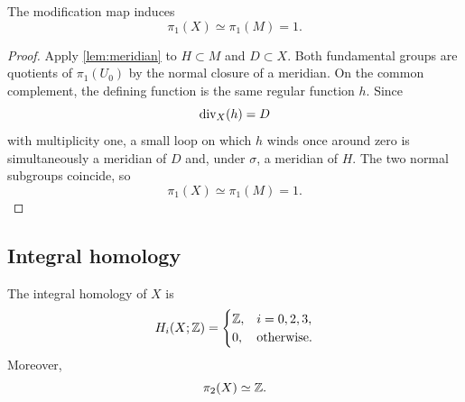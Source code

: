 \begin{theorem}\label{thm:pi1}
The modification map induces
\[
  \pi_1(X)\simeq\pi_1(M)=1.
\]
\end{theorem}

\begin{proof}
Apply \cref{lem:meridian} to $H\subset M$ and $D\subset X$.  Both fundamental groups are quotients of $\pi_1(U_0)$ by the normal closure of a meridian.  On the common complement, the defining function is the same regular function $h$.  Since
\[
  \operatorname{div}_X(h)=D
\]
with multiplicity one, a small loop on which $h$ winds once around zero is simultaneously a meridian of $D$ and, under $\sigma$, a meridian of $H$.  The two normal subgroups coincide, so
\[
  \pi_1(X)\simeq\pi_1(M)=1.
\]
\end{proof}

\subsection{Integral homology}

\begin{theorem}\label{thm:homology}
The integral homology of $X$ is
\[
  H_i(X;\mathbb Z)=
  \begin{cases}
    \mathbb Z,&i=0,2,3,\\
    0,&\text{otherwise}.
  \end{cases}
\]
Moreover,
\[
  \pi_2(X)\simeq\mathbb Z.
\]
\end{theorem}

